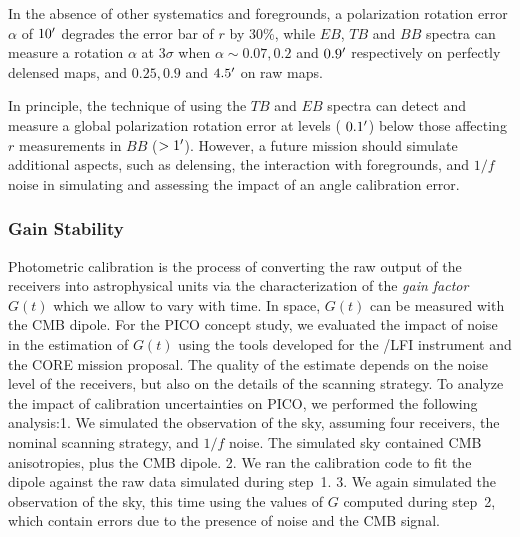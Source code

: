 \documentclass[PICOReport.tex]{subfiles}
\begin{document}
In the absence of other systematics and foregrounds, a polarization rotation error $\alpha$ of $10'$ degrades 
the error bar of $r$ by 30\%, while $EB$, $TB$ and $BB$ spectra can measure a rotation $\alpha$ at 3$\sigma$ when $\alpha \sim 0.07, 0.2$  and $0.9'$ respectively
 on perfectly delensed maps, and $0.25, 0.9$ and $4.5'$ on raw maps.

In principle, the technique of using the $TB$ and $EB$ spectra can detect and measure a global polarization rotation error at levels ($~0.1 '$) below those affecting $r$ measurements in $BB$ ($> 1 '$).  However, a future mission should simulate additional aspects, such as delensing, the interaction with foregrounds, and $1/f$ noise in simulating and assessing the impact of an angle calibration error.

\subsubsection{Gain Stability}
\label{sec:gain}



Photometric calibration is the process of converting the raw output of the receivers into astrophysical units via the characterization of the \emph{gain factor} $G(t)$ which we allow to vary with time.  In space, $G(t)$ can be measured with the CMB dipole.   For the PICO concept study, we evaluated the impact of noise in the estimation of $G(t)$ using the tools developed for the \planck/LFI instrument and the CORE mission proposal. The quality of the estimate depends on the noise level of the receivers, but also on the details of the scanning strategy. 
To analyze the impact of calibration uncertainties on PICO, we performed  the following analysis:1. We simulated the observation of the sky, assuming four receivers, the nominal scanning strategy, and $1/f$ noise. The simulated sky contained CMB anisotropies, plus the CMB dipole. 2. We ran the calibration code to fit the dipole against the raw data simulated during step~1. 3. We again simulated the observation of the sky, this time using the values of $G$ computed during step~2, which contain errors due to the presence of noise and the CMB signal.
\end{document}
